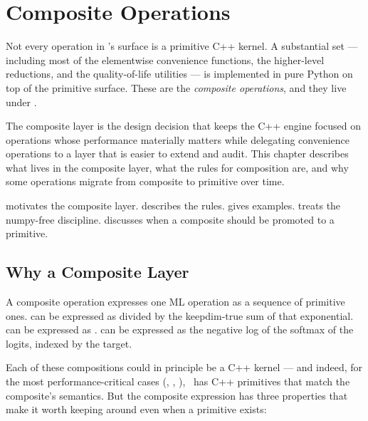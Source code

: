 \chapter{Composite Operations}
\label{ch:composite_ops}

Not every operation in \Lucid's surface is a primitive C++ kernel.
A substantial set --- including most of the elementwise convenience
functions, the higher-level reductions, and the
quality-of-life utilities --- is implemented in pure Python on top
of the primitive surface. These are the \emph{composite
operations}, and they live under .

The composite layer is the design decision that keeps the C++
engine focused on operations whose performance materially matters
while delegating convenience operations to a layer that is easier
to extend and audit. This chapter describes what lives in the
composite layer, what the rules for composition are, and why some
operations migrate from composite to primitive over time.

 motivates the composite layer.
 describes the rules.
 gives examples.
 treats the numpy-free
discipline.
 discusses when a composite
should be promoted to a primitive.

\section{Why a Composite Layer}
\label{sec:composite_ops:why}

A composite operation expresses one ML operation as a sequence of
primitive ones.  can be expressed as
 divided by the
keepdim-true sum of that exponential.  can
be expressed as . 
can be expressed as the negative log of the softmax of the logits,
indexed by the target.

Each of these compositions could in principle be a C++ kernel ---
and indeed, for the most performance-critical cases
(, , ), \Lucid\
has C++ primitives that match the composite's semantics. But the
composite expression has three properties that make it worth
keeping around even when a primitive exists:

